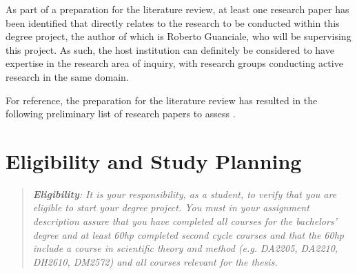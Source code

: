 \documentclass[12pt, a4paper]{article}
\begin{document}
As part of a preparation for the literature review, at least one research paper \cite{sound_transpilation_from_binary_to_ir} has been identified that directly relates to the research to be conducted within this degree project, the author of which is Roberto Guanciale, who will be supervising this project. As such, the host institution can definitely be considered to have expertise in the research area of inquiry, with research groups conducting active research in the same domain.

For reference, the preparation for the literature review has resulted in the following preliminary list of research papers to assess \cite{graph_based_ir,retargetable_binary_translator,dynamic_binary_translation,uqbt_binary_translator,retargetable_static_binary_translator,ssa_for_decompilation,valgrind,bitblaze,architecture_independent_binary_analysis_and_transformation,arm_analysis_using_llvm,bap,revgen,wartell_rewriting_x86_binaries,barf,singled_graph_disassembly,dbill,instruction_idiom_detection,graph_based_higher_order_ir,reconstruction_of_instruction_idioms,extracting_instruction_semantics_via_symbolic_exectuion_of_code_generators,software_transformation,state_of_the_art_of_war,function_recovery,bin2llvm,sound_transpilation_from_binary_to_ir,cast_study_llvm_suitable_for_binary_analysis,revng,evaluation_of_irs,binrec,lifter_synthesis,superset_disassembly,b2r2,llvm_ir_lifter_using_mcsema_and_dyninst,gtirb,case_for_bap_and_angr,retrowrite}.


\section{Eligibility and Study Planning}

\begin{quote}
	\textit{\textbf{Eligibility}: It is your responsibility, as a student, to verify that you are eligible to start your degree project. You must in your assignment description assure that you have completed all courses for the bachelors' degree and at least 60hp completed second cycle courses and that the 60hp include a course in scientific theory and method (e.g. DA2205, DA2210, DH2610, DM2572) and all courses relevant for the thesis.}
\end{quote}
\end{document}
